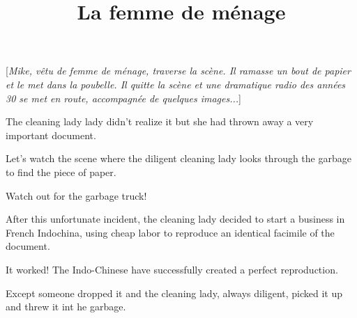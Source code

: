 \documentclass[a4paper]{article}
\title{La femme de ménage}
\date{}
\author{}
\begin{document}
\maketitle

\begin{center}

[\emph{Mike, vêtu de femme de ménage, traverse la scène. Il ramasse un bout de
papier et le met dans la poubelle. Il quitte la scène et une dramatique
radio des années 30 se met en route, accompagnée de quelques images...}]
\end{center}

The cleaning lady lady didn't realize it but she had thrown away a very
important document.

\begin{comment}
La femme de ménage ne le savait pas, mais elle vient de jeter un document
très important.
\end{comment}

Let's watch the scene where the diligent cleaning lady looks through the
garbage to find the piece of paper.

\begin{comment}
Assistons donc à la scène où la diligente femme de ménage fouille dans les
déchets pour trouver le papier.
\end{comment}

Watch out for the garbage truck!

\begin{comment}
Attention au camion poubelle!
\end{comment}

After this unfortunate incident, the cleaning lady decided to start a business
in French Indochina, using cheap labor to reproduce an identical facimile of
the document.

\begin{comment}
Après cet échec, la femme de ménage voyage en Indochine, ou la main-d’œuvre
n’est pas chère, afin de créer une entreprise capable de reproduire le document
à l’identique.
\end{comment}

It worked!  The Indo-Chinese have successfully created a perfect reproduction.

\begin{comment}
Ça a bien marché! On a réussi à faire un fac-similé parfait du document.
\end{comment}

Except someone dropped it and the cleaning lady, always diligent, picked it
up and threw it int he garbage.
\end{document}
